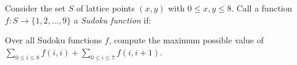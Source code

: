 Consider the set $S$ of lattice points $(x,y)$ with $0\le x,y\le 8$. Call a function $f:S\to \{1,2,\dots, 9\}$ a \emph{Sudoku function} if:
\begin{itemize}
\end{itemize}
Over all Sudoku functions $f$, compute the maximum possible value of $\sum_{0\le i\le 8} f(i,i) + \sum_{0\le i\le 7} f(i, i+1)$.
